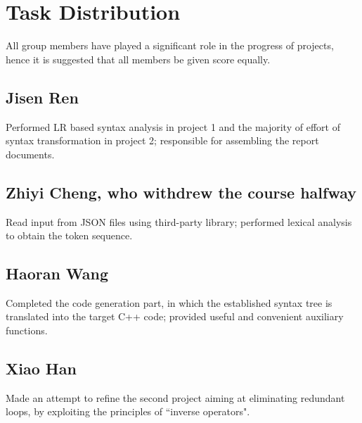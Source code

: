 \documentclass[a4paper,11pt]{article}
\begin{document}
	\section{Task Distribution}
	All group members have played a significant role in the progress of projects, hence it is suggested that all members be given score equally. \par 
	\subsection{Jisen Ren}
	Performed LR based syntax analysis in project 1 and the majority of effort of syntax transformation in project 2; responsible for assembling the report documents. 
	\subsection{Zhiyi Cheng, who withdrew the course halfway}
	Read input from JSON files using third-party library; performed lexical analysis to obtain the token sequence.
	\subsection{Haoran Wang}
	Completed the code generation part, in which the established syntax tree is translated into the target C++ code; provided useful and convenient auxiliary functions.
	\subsection{Xiao Han}
	Made an attempt to refine the second project aiming at eliminating redundant loops, by exploiting the principles of ``inverse operators". 
\end{document}
